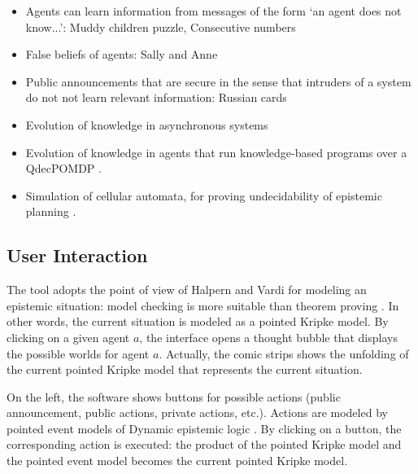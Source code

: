 \documentclass{article}
\begin{document}
\begin{itemize}
	\item Agents can learn information from messages of the form `an agent does not know...': Muddy children puzzle, Consecutive numbers \cite{van2015one}
	\item False beliefs of agents: Sally and Anne \cite{wimmer1983beliefs}
	\item Public announcements that are secure in the sense that intruders of a system do not not learn relevant information: Russian cards \cite{DBLP:journals/sLogica/Ditmarsch03}
	\item Evolution of knowledge in asynchronous systems \cite{knight_maubert_schwarzentruber_2017}
	\item Evolution of knowledge in agents that run knowledge-based programs over a QdecPOMDP \cite{AAAI2018kbps}.
	\item Simulation of cellular automata, for proving undecidability of epistemic planning \cite{ijcai2018SmallUndecidableEpistemicPlanning}.
\end{itemize} 



\subsection{User Interaction}

The tool adopts the point of view of Halpern and Vardi for modeling an epistemic situation: model checking is more suitable than theorem proving \cite{DBLP:conf/kr/HalpernV91}. In other words, the current situation is modeled as a pointed Kripke model.
By clicking on a given agent $a$, the interface opens a thought bubble that displays the possible worlds for agent $a$. Actually, the comic strips shows the unfolding of the current pointed Kripke model that represents the current situation.

On the left, the software shows buttons for possible actions (public announcement, public actions, private actions, etc.). Actions are modeled by pointed event models of Dynamic epistemic logic \cite{baltag1998logic}. By clicking on a button, the corresponding action is executed: the product of the pointed Kripke model and the pointed event model becomes the current pointed Kripke model.
\end{document}
